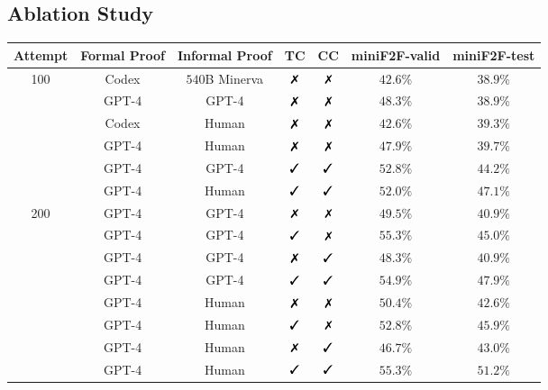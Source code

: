 \documentclass{article} \usepackage{iclr2024_conference,times}
\newcommand{\cmark}{\text{\ding{51}}}
\newcommand{\xmark}{\text{\ding{55}}}
\def\methodOne{TC\xspace}
\def\methodOneFull{\textit{Tool Correction}\xspace}
\def\methodTwo{CC\xspace}
\def\methodTwoFull{\textit{Conjecture Correction}\xspace}
\begin{document}
\subsection{Ablation Study}
\begin{table*}[t]
\begin{center}
\caption{
\small
\textbf{Ablation results on the miniF2F dataset with Isabelle.} There are three important conclusions: 1) GPT-4 is better than Codex for mathematical proving; 2) \methodOneFull can consistently improve performance; 3) \methodTwoFull can improve performance but needs more attempts. \textbf{Our proposed method degrades to DSP~\citep{jiang2023draft} when without \methodOneFull and \methodTwoFull}.
}
\label{tab:ablation_study} \small
\begin{tabular}{ccccccc}
    \toprule
    Attempt &  Formal Proof &  Informal Proof& \methodOne & \methodTwo & miniF2F-valid & miniF2F-test\\
    

    \midrule
     \multirow{6}{*}{100}   &Codex  &$540$B Minerva&$\xmark$ & $\xmark$ & $42.6\%$ & $38.9\%$ \\
     &  GPT-4 &   GPT-4 & $\xmark$ & $\xmark$ & $48.3\%$ & $38.9\%$ \\
     \cmidrule{2-7}
      &  Codex &  Human & $\xmark$ & $\xmark$ & $42.6\%$ & $39.3\%$ \\
       &  GPT-4 &    Human & $\xmark$ & $\xmark$ & $47.9\%$ & $39.7\%$ \\
\cmidrule{2-7}

     
     &  GPT-4 &   GPT-4 &$\cmark$ & $\cmark$& $52.8\%$ & $44.2\%$ \\
     &   GPT-4 &   Human &$\cmark$ & $\cmark$ & $52.0\%$ & $47.1\%$ \\
    \midrule


  \multirow{8}{*}{200} & GPT-4 &   GPT-4 & $\xmark$ & $\xmark$ & $49.5\%$ & $40.9\%$ \\
   & GPT-4 &    GPT-4 & $\cmark$ & $\xmark$ & $55.3\%$ & $45.0\%$ \\
    &  GPT-4 &    GPT-4 & $\xmark$ & $\cmark$ & $48.3\%$ & $40.9\%$ \\
     &  GPT-4 &    GPT-4 & $\cmark$ & $\cmark$ & $54.9\%$ & $47.9\%$ \\
     \cmidrule{2-7}

      &    GPT-4 &    Human & $\xmark$ & $\xmark$ & $50.4\%$ & $42.6\%$ \\
  &   GPT-4 &    Human & $\cmark$ & $\xmark$ & $52.8\%$ & $45.9\%$ \\
   &  GPT-4 &    Human & $\xmark$ & $\cmark$ & $46.7\%$ & $43.0\%$ \\
    &   GPT-4 &    Human & $\cmark$ & $\cmark$ & $\mathbf{55.3\%}$ & $\mathbf{51.2\%}$ \\

   
    \bottomrule
\end{tabular}
\end{center}
\vspace{-0.1in}
\end{table*}
\end{document}
